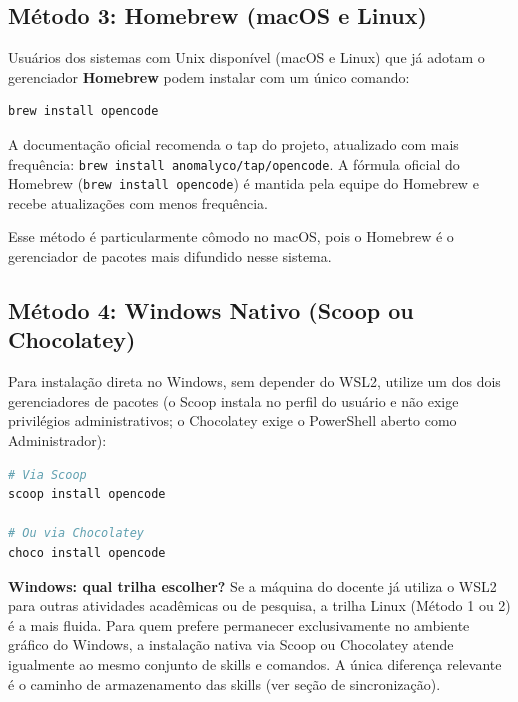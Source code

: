 \subsection{M{\'e}todo 3: Homebrew (macOS e Linux)}

Usu{\'a}rios dos sistemas com Unix dispon{\'i}vel (macOS e Linux) que j{\'a} adotam o gerenciador \textbf{Homebrew} podem instalar com um {\'u}nico comando:

\begin{lstlisting}[language=bash, caption={Instala{\c c}{\~a}o via Homebrew}]
brew install opencode
\end{lstlisting}

A documenta{\c c}{\~a}o oficial recomenda o tap do projeto, atualizado com mais frequ{\^e}ncia: \texttt{brew install anomalyco/tap/opencode}. A f{\'o}rmula oficial do Homebrew (\texttt{brew install opencode}) {\'e} mantida pela equipe do Homebrew e recebe atualiza{\c c}{\~o}es com menos frequ{\^e}ncia.

Esse m{\'e}todo {\'e} particularmente c{\^o}modo no macOS, pois o Homebrew {\'e} o gerenciador de pacotes mais difundido nesse sistema.

\subsection{M{\'e}todo 4: Windows Nativo (Scoop ou Chocolatey)}

Para instala{\c c}{\~a}o direta no Windows, sem depender do WSL2, utilize um dos dois gerenciadores de pacotes (o Scoop instala no perfil do usu{\'a}rio e n{\~a}o exige privil{\'e}gios administrativos; o Chocolatey exige o PowerShell aberto como Administrador):

\begin{lstlisting}[language=bash, caption={Instala{\c c}{\~a}o no Windows via Scoop ou Chocolatey}]
# Via Scoop
scoop install opencode

# Ou via Chocolatey
choco install opencode
\end{lstlisting}

\begin{dicaopencode}
\textbf{Windows: qual trilha escolher?} Se a m{\'a}quina do docente j{\'a} utiliza o WSL2 para outras atividades acad{\^e}micas ou de pesquisa, a trilha Linux (M{\'e}todo 1 ou 2) {\'e} a mais fluida. Para quem prefere permanecer exclusivamente no ambiente gráfico do Windows, a instala{\c c}{\~a}o nativa via Scoop ou Chocolatey atende igualmente ao mesmo conjunto de skills e comandos. A {\'u}nica diferen{\c c}a relevante {\'e} o caminho de armazenamento das skills (ver se{\c c}{\~a}o de sincroniza{\c c}{\~a}o).
\end{dicaopencode}

